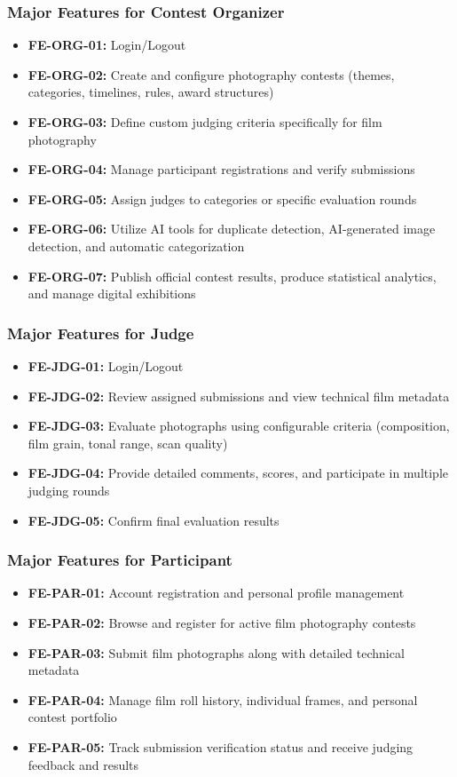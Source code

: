 \subsubsection{Major Features for Contest Organizer}
\begin{itemize}
    \item \textbf{FE-ORG-01:} Login/Logout
    \item \textbf{FE-ORG-02:} Create and configure photography contests (themes, categories, timelines, rules, award structures)
    \item \textbf{FE-ORG-03:} Define custom judging criteria specifically for film photography
    \item \textbf{FE-ORG-04:} Manage participant registrations and verify submissions
    \item \textbf{FE-ORG-05:} Assign judges to categories or specific evaluation rounds
    \item \textbf{FE-ORG-06:} Utilize AI tools for duplicate detection, AI-generated image detection, and automatic categorization
    \item \textbf{FE-ORG-07:} Publish official contest results, produce statistical analytics, and manage digital exhibitions
\end{itemize}

\subsubsection{Major Features for Judge}
\begin{itemize}
    \item \textbf{FE-JDG-01:} Login/Logout
    \item \textbf{FE-JDG-02:} Review assigned submissions and view technical film metadata
    \item \textbf{FE-JDG-03:} Evaluate photographs using configurable criteria (composition, film grain, tonal range, scan quality)
    \item \textbf{FE-JDG-04:} Provide detailed comments, scores, and participate in multiple judging rounds
    \item \textbf{FE-JDG-05:} Confirm final evaluation results
\end{itemize}

\subsubsection{Major Features for Participant}
\begin{itemize}
    \item \textbf{FE-PAR-01:} Account registration and personal profile management
    \item \textbf{FE-PAR-02:} Browse and register for active film photography contests
    \item \textbf{FE-PAR-03:} Submit film photographs along with detailed technical metadata
    \item \textbf{FE-PAR-04:} Manage film roll history, individual frames, and personal contest portfolio
    \item \textbf{FE-PAR-05:} Track submission verification status and receive judging feedback and results
\end{itemize}

